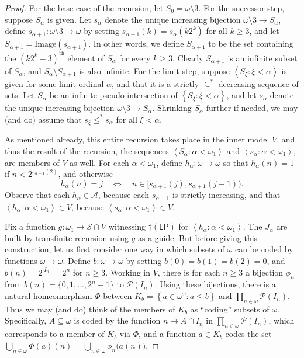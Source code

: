 \documentclass[11pt,leqno]{amsart}
\theoremstyle{definition}
\theoremstyle{remark}
\newcommand{\A}{\mathcal{A}}
\renewcommand{\P}{\mathcal{P}}
\newcommand{\explicitSet}[1]{\left\lbrace #1 \right\rbrace}
\newcommand{\brackets}[1]{\left\langle #1 \right\rangle}
\newcommand{\set}[2]{\explicitSet{#1 \colon #2}}
\newcommand{\seq}[2]{\brackets{#1 \colon #2}}
\newcommand{\<}{\langle}
\renewcommand{\>}{\rangle}
\renewcommand{\a}{\alpha}
\newcommand{\w}{\omega}
\newcommand{\0}{\emptyset}
\newcommand{\sub}{\subseteq}
\newcommand{\1}{1\hspace{-1.75mm}1}
\newcommand{\cLP}{\dagger(\mathsf{LP})}
\begin{document}
\begin{proof}
For the base case of the recursion, let $S_0 = \w \setminus 3$. 
For the successor step, suppose $S_\a$ is given. 
Let $s_\a$ denote the unique increasing bijection $\w \setminus 3 \to S_\a$, define $s_{\a+1}: \w \setminus 3 \to \w$ by setting $s_{\a+1}(k) = s_\a(k2^k)$ for all $k \geq 3$, and let $S_{\a+1} = \mathrm{Image}(s_{\a+1})$. 
In other words, we define $S_{\a+1}$ to be the set containing the $(k2^k - 3)^\mathrm{th}$ element of $S_\a$ for every $k \geq 3$. Clearly $S_{\a+1}$ is an infinite subset of $S_\a$, and $S_\a \setminus S_{\a+1}$ is also infinite. 
For the limit step, suppose $\seq{S_\xi}{\xi < \a}$ is given for some limit ordinal $\a$, and that it is a strictly $\sub^*$-decreasing sequence of sets. 
Let $S_\a$ be an infinite pseudo-intersection of $\set{S_\xi}{\xi < \a}$, and let $s_\a$ denote the unique increasing bijection $\w \setminus 3 \to S_\a$. Shrinking $S_\a$ further if needed, we may (and do) assume that $s_\xi \leq^* s_\a$ for all $\xi < \a$. 

As mentioned already, this entire recursion takes place in the inner model $V$, and thus the result of the recursion, the sequences $\seq{S_\a}{\a < \w_1}$ and $\seq{s_\a}{\a < \w_1}$, are members of $V$ as well. 
For each $\a < \w_1$, define $h_\a: \w \to \w$ so that $h_\a(n) = 1$ if $n < 2^{s_{\a+1}(2)}$, and otherwise  
$$h_\a(n) = j \quad \Leftrightarrow \quad n \in \big[ s_{\a+1}(j),s_{\a+1}(j+1) \big).$$
Observe that each $h_\a \in \A$, because each $s_{\a+1}$ is strictly increasing, and that $\seq{h_\a}{\a < \w_1} \in V$, because $\seq{s_\a}{\a < \w_1} \in V$. 

Fix a function $g: \w_1 \to \mathcal S \cap V$ witnessing $\cLP$ for $\seq{h_\a}{\a < \w_1}$. 
The $J_\a$ are built by transfinite recursion using $g$ as a guide. 
But before giving this construction, let us first consider one way in which subsets of $\w$ can be coded by functions $\w \to \w$. 
Define $b: \w \to \w$ by setting $b(0)=b(1)=b(2)=0$, and $b(n) = 2^{|I_n|} = 2^n$ for $n \geq 3$. 
Working in $V$, there is for each $n \geq 3$ a bijection $\phi_n$ from $b(n) = \{0,1,\dots,2^n-1\}$ to $\P(I_n)$. 
Using these bijections, there is a natural homeomorphism $\Phi$ between 
$K_b = \set{a \in \w^\w}{a \leq b}$ and $\prod_{n \in \w}\P(I_n)$. 
Thus we may (and do) think of the members of $K_b$ as ``coding'' subsets of $\w$. Specifically, $A \sub \w$ is coded by the function $n \mapsto A \cap I_n$ in $\prod_{n \in \w}\P(I_n)$, which corresponds to a member of $K_b$ via $\Phi$, and a function $a \in K_b$ codes the set $\bigcup_{n \in \w}\Phi(a)(n) = \bigcup_{n \in \w}\phi_n\big(a(n)\big)$. 


\end{proof}
\end{document}
